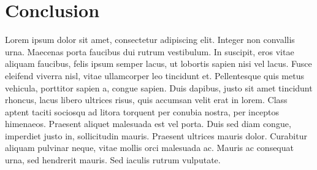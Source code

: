 \section{Conclusion}
Lorem ipsum dolor sit amet, consectetur adipiscing elit. Integer non convallis urna. Maecenas porta faucibus dui rutrum vestibulum. In suscipit, eros vitae aliquam faucibus, felis ipsum semper lacus, ut lobortis sapien nisi vel lacus. Fusce eleifend viverra nisl, vitae ullamcorper leo tincidunt et. Pellentesque quis metus vehicula, porttitor sapien a, congue sapien. Duis dapibus, justo sit amet tincidunt rhoncus, lacus libero ultrices risus, quis accumsan velit erat in lorem. Class aptent taciti sociosqu ad litora torquent per conubia nostra, per inceptos himenaeos. Praesent aliquet malesuada est vel porta. Duis sed diam congue, imperdiet justo in, sollicitudin mauris. Praesent ultrices mauris dolor. Curabitur aliquam pulvinar neque, vitae mollis orci malesuada ac. Mauris ac consequat urna, sed hendrerit mauris. Sed iaculis rutrum vulputate. 